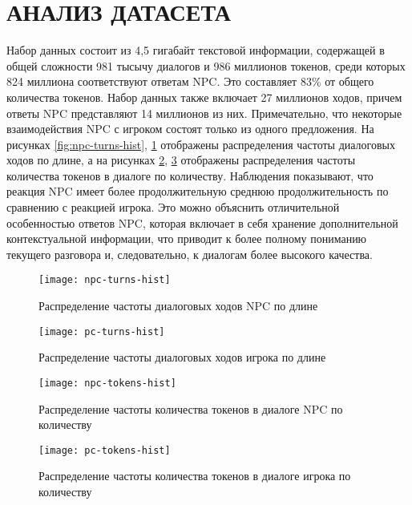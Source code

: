 \section{АНАЛИЗ ДАТАСЕТА}
Набор данных состоит из 4,5 гигабайт текстовой информации, содержащей в общей сложности 981 тысычу диалогов и 986 миллионов токенов, среди которых 824 миллиона соответствуют ответам NPC. Это составляет 83\% от общего количества токенов. Набор данных также включает 27 миллионов ходов, причем ответы NPC представляют 14 миллионов из них. Примечательно, что некоторые взаимодействия NPC с игроком состоят только из одного предложения. На рисунках \ref{fig:npc-turns-hist}, \ref{fig:pc-turns-hist} отображены распределения частоты диалоговых ходов по длине, а на рисунках \ref{fig:npc-tokens-hist}, \ref{fig:pc-tokens-hist} отображены распределения частоты количества токенов в диалоге по количеству. Наблюдения показывают, что реакция NPC имеет более продолжительную среднюю продолжительность по сравнению с реакцией игрока. Это можно объяснить отличительной особенностью ответов NPC, которая включает в себя хранение дополнительной контекстуальной информации, что приводит к более полному пониманию текущего разговора и, следовательно, к диалогам более высокого качества.
\begin{figure}[H]
  \begin{minipage}{0.48\textwidth}
    \centering
    \texttt{[image: npc-turns-hist]}
    \caption{Распределение частоты диалоговых ходов NPC по длине}\label{fig:npc-turns-hist}
  \end{minipage}\hfill
  \begin{minipage}{0.48\textwidth}
    \centering
    \texttt{[image: pc-turns-hist]}
    \caption{Распределение частоты диалоговых ходов игрока по длине}\label{fig:pc-turns-hist}
  \end{minipage}
\end{figure}

\begin{figure}[H]
  \centering
  \texttt{[image: npc-tokens-hist]}
  \caption{Распределение частоты количества токенов в диалоге NPC по количеству}
  \label{fig:npc-tokens-hist}
\end{figure}

\begin{figure}[H]
  \centering
  \texttt{[image: pc-tokens-hist]}
  \caption{Распределение частоты количества токенов в диалоге игрока по количеству}
  \label{fig:pc-tokens-hist}
\end{figure}